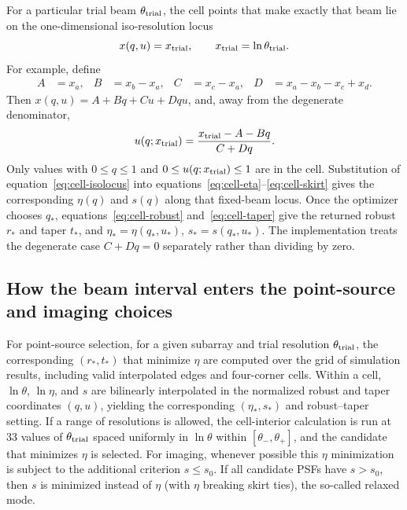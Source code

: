 \documentclass[11pt]{article}
\begin{document}
For a particular trial beam $\theta_{\rm trial}$, the cell points that make exactly that
beam lie on the one-dimensional iso-resolution locus
\begin{equation}
 x(q,u)=x_{\rm trial},\qquad x_{\rm trial}=\ln\theta_{\rm trial}.
 \label{eq:iso-resolution}
\end{equation}
For example, define
\begin{align*}
 A&=x_a,&B&=x_b-x_a,&C&=x_c-x_a,&
 D&=x_a-x_b-x_c+x_d.
\end{align*}
Then $x(q,u)=A+Bq+Cu+Dqu$, and, away from the degenerate denominator,
\begin{equation}
 u(q;x_{\rm trial})=\frac{x_{\rm trial}-A-Bq}{C+Dq}.
 \label{eq:cell-isolocus}
\end{equation}
Only values with $0\le q\le1$ and $0\le u(q;x_{\rm trial})\le1$ are in the cell.
Substitution of equation~\eqref{eq:cell-isolocus} into
equations~\eqref{eq:cell-eta}--\eqref{eq:cell-skirt} gives the corresponding
$\eta(q)$ and $s(q)$ along that fixed-beam locus.  Once the optimizer chooses
$q_*$, equations~\eqref{eq:cell-robust} and~\eqref{eq:cell-taper} give the
returned robust $r_*$ and taper $t_*$, and
$\eta_*=\eta(q_*,u_*)$, $s_*=s(q_*,u_*)$.  The implementation treats the
degenerate case $C+Dq=0$ separately rather than dividing by zero.

\subsection{How the beam interval enters the point-source and imaging choices}

For point-source selection, for a given subarray and trial resolution
$\theta_{\rm trial}$, the corresponding $(r_*,t_*)$ that minimize $\eta$ are
computed over the grid of simulation results, including valid interpolated
edges and four-corner cells.  Within a cell, $\ln\theta$, $\ln\eta$, and $s$
are bilinearly interpolated in the normalized robust and taper coordinates
$(q,u)$, yielding the corresponding $(\eta_*,s_*)$ and robust--taper setting.
If a range of resolutions is allowed, the cell-interior calculation is run at
33 values of $\theta_{\rm trial}$ spaced uniformly in $\ln\theta$ within
$[\theta_-,\theta_+]$, and the candidate that minimizes $\eta$ is selected.
For imaging, whenever possible this $\eta$ minimization is subject to the
additional criterion $s\le s_0$.  If all candidate PSFs have $s>s_0$, then
$s$ is minimized instead of $\eta$ (with $\eta$ breaking skirt ties), the
so-called relaxed mode.
\end{document}
